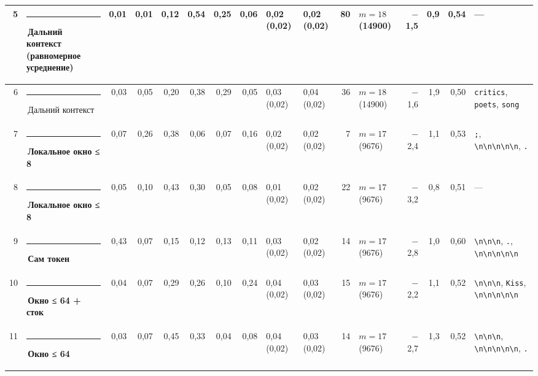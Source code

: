 \documentclass[10pt]{article}
\begin{document}
\begin{minipage}{\linewidth}
\begin{center}
{\begin{tabular}{|r|l|r|r|r|r|r|r|l|l|r|l|r|r|r|l|}
5 & \textcolor[HTML]{C3C2B7}{\rule{0.62em}{0.62em}}\,Дальний контекст (равномерное усреднение) & 0,01 & 0,01 & 0,12 & 0,54 & 0,25 & 0,06 & 0,02 (0,02) & 0,02 (0,02) & 80 & $m{=}18$ (14900) & $-$1,5 & 0,9 & 0,54 & — \\ \hline
6 & \textcolor[HTML]{C3C2B7}{\rule{0.62em}{0.62em}}\,Дальний контекст & 0,03 & 0,05 & 0,20 & 0,38 & 0,29 & 0,05 & 0,03 (0,02) & 0,04 (0,02) & 36 & $m{=}18$ (14900) & $-$1,6 & 1,9 & 0,50 & \texttt{\textvisiblespace{}critics}, \texttt{\textvisiblespace{}poets}, \texttt{\textvisiblespace{}song} \\ \hline
7 & \textcolor[HTML]{1BAF7A}{\rule{0.62em}{0.62em}}\,\textbf{Локальное окно ≤ 8} & 0,07 & 0,26 & 0,38 & 0,06 & 0,07 & 0,16 & 0,02 (0,02) & 0,02 (0,02) & 7 & $m{=}17$ (9676) & $-$2,4 & 1,1 & 0,53 & \texttt{\textvisiblespace{};}, \texttt{\textbackslash{}n\textbackslash{}n\textbackslash{}n\textbackslash{}n\textbackslash{}n}, \texttt{\textvisiblespace{}.} \\ \hline
8 & \textcolor[HTML]{1BAF7A}{\rule{0.62em}{0.62em}}\,\textbf{Локальное окно ≤ 8} & 0,05 & 0,10 & 0,43 & 0,30 & 0,05 & 0,08 & 0,01 (0,02) & 0,02 (0,02) & 22 & $m{=}17$ (9676) & $-$3,2 & 0,8 & 0,51 & — \\ \hline
9 & \textcolor[HTML]{2A78D6}{\rule{0.62em}{0.62em}}\,\textbf{Сам токен} & 0,43 & 0,07 & 0,15 & 0,12 & 0,13 & 0,11 & 0,03 (0,02) & 0,02 (0,02) & 14 & $m{=}17$ (9676) & $-$2,8 & 1,0 & 0,60 & \texttt{\textvisiblespace{}\textbackslash{}n\textbackslash{}n\textbackslash{}n}, \texttt{\textvisiblespace{}.}, \texttt{\textbackslash{}n\textbackslash{}n\textbackslash{}n\textbackslash{}n\textbackslash{}n} \\ \hline
10 & \textcolor[HTML]{EDA100}{\rule{0.62em}{0.62em}}\,\textbf{Окно ≤ 64 + сток} & 0,04 & 0,07 & 0,29 & 0,26 & 0,10 & 0,24 & 0,04 (0,02) & 0,03 (0,02) & 15 & $m{=}17$ (9676) & $-$2,2 & 1,1 & 0,52 & \texttt{\textvisiblespace{}\textbackslash{}n\textbackslash{}n\textbackslash{}n}, \texttt{\textvisiblespace{}Kiss}, \texttt{\textbackslash{}n\textbackslash{}n\textbackslash{}n\textbackslash{}n\textbackslash{}n} \\ \hline
11 & \textcolor[HTML]{EDA100}{\rule{0.62em}{0.62em}}\,\textbf{Окно ≤ 64} & 0,03 & 0,07 & 0,45 & 0,33 & 0,04 & 0,08 & 0,04 (0,02) & 0,03 (0,02) & 14 & $m{=}17$ (9676) & $-$2,7 & 1,3 & 0,52 & \texttt{\textvisiblespace{}\textbackslash{}n\textbackslash{}n\textbackslash{}n}, \texttt{\textbackslash{}n\textbackslash{}n\textbackslash{}n\textbackslash{}n\textbackslash{}n}, \texttt{\textvisiblespace{}.} \\ \hline

\end{tabular}}
\end{center}
\end{minipage}
\end{document}

